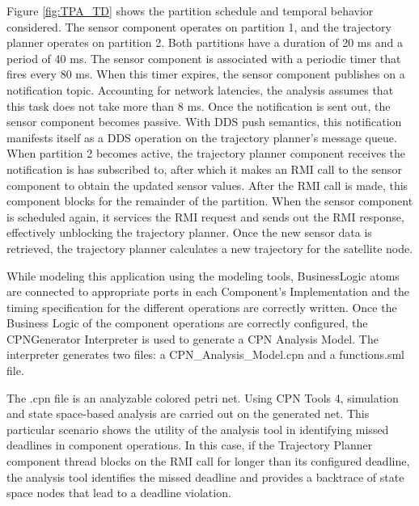 Figure \ref{fig:TPA_TD} shows the partition schedule and temporal behavior considered. The sensor component operates on partition 1, and the trajectory planner operates on partition 2. Both partitions have a duration of 20 ms and a period of 40 ms. The sensor component is associated with a periodic timer that fires every 80 ms. When this timer expires, the sensor component publishes on a notification topic. Accounting for network latencies, the analysis assumes that this task does not take more than 8 ms. Once the notification is sent out, the sensor component becomes passive. With DDS push semantics, this notification manifests itself as a DDS operation on the trajectory planner's message queue. When partition 2 becomes active, the trajectory planner component receives the notification is has subscribed to, after which it makes an RMI call to the sensor component to obtain the updated sensor values. After the RMI call is made, this component blocks for the remainder of the partition. When the sensor component is scheduled again, it services the RMI request and sends out the RMI response, effectively unblocking the trajectory planner. Once the new sensor data is retrieved, the trajectory planner calculates a new trajectory for the satellite node.

While modeling this application using the modeling tools, BusinessLogic atoms are connected to appropriate ports in each Component's Implementation and the timing specification for the different operations are correctly written. Once the Business Logic of the component operations are correctly configured, the CPNGenerator Interpreter is used to generate a CPN Analysis Model. The interpreter generates two files: a CPN\_Analysis\_Model.cpn and a functions.sml file.  

The .cpn file is an analyzable colored petri net. Using CPN Tools 4, simulation and state space-based analysis are carried out on the generated net. This particular scenario shows the utility of the analysis tool in identifying missed deadlines in component operations. In this case, if the Trajectory Planner component thread blocks on the RMI call for longer than its configured deadline, the analysis tool identifies the missed deadline and provides a backtrace of state space nodes that lead to a deadline violation. 

